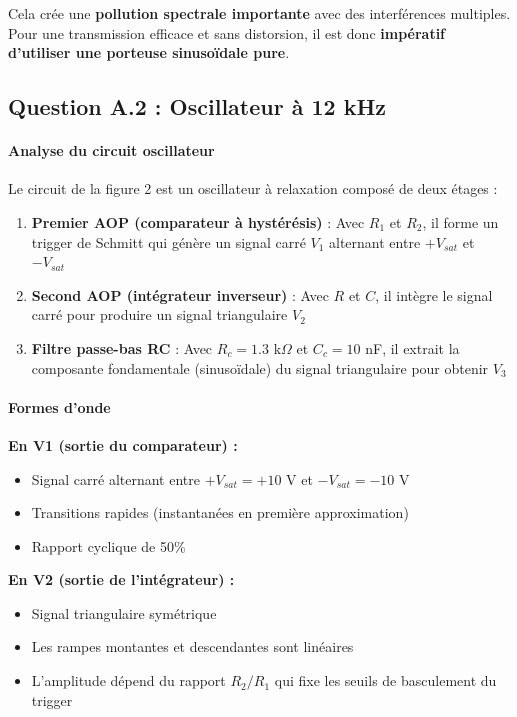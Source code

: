 \documentclass[11pt,a4paper]{article}
\begin{document}
Cela crée une \textbf{pollution spectrale importante} avec des interférences multiples. Pour une transmission efficace et sans distorsion, il est donc \textbf{impératif d'utiliser une porteuse sinusoïdale pure}.

\subsection{Question A.2 : Oscillateur à 12 kHz}

\paragraph{Analyse du circuit oscillateur}

Le circuit de la figure 2 est un oscillateur à relaxation composé de deux étages :

\begin{enumerate}
    \item \textbf{Premier AOP (comparateur à hystérésis)} : Avec $R_1$ et $R_2$, il forme un trigger de Schmitt qui génère un signal carré $V_1$ alternant entre $+V_{sat}$ et $-V_{sat}$
    
    \item \textbf{Second AOP (intégrateur inverseur)} : Avec $R$ et $C$, il intègre le signal carré pour produire un signal triangulaire $V_2$
    
    \item \textbf{Filtre passe-bas RC} : Avec $R_c = 1.3$ k$\Omega$ et $C_c = 10$ nF, il extrait la composante fondamentale (sinusoïdale) du signal triangulaire pour obtenir $V_3$
\end{enumerate}

\paragraph{Formes d'onde}

\textbf{En V1 (sortie du comparateur) :}
\begin{itemize}
    \item Signal carré alternant entre $+V_{sat} = +10$ V et $-V_{sat} = -10$ V
    \item Transitions rapides (instantanées en première approximation)
    \item Rapport cyclique de 50\%
\end{itemize}

\textbf{En V2 (sortie de l'intégrateur) :}
\begin{itemize}
    \item Signal triangulaire symétrique
    \item Les rampes montantes et descendantes sont linéaires
    \item L'amplitude dépend du rapport $R_2/R_1$ qui fixe les seuils de basculement du trigger
\end{itemize}
\end{document}
